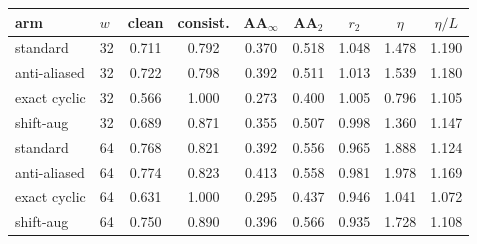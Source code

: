 \begin{tabular}{ll cccc ccc}
\toprule
arm & $w$ & clean & consist. & AA$_{\infty}$ & AA$_{2}$ & $r_2$ & $\eta$ & $\eta/L$ \\
\midrule
standard & 32 & 0.711 & 0.792 & 0.370 & 0.518 & 1.048 & 1.478 & 1.190 \\
anti-aliased & 32 & 0.722 & 0.798 & 0.392 & 0.511 & 1.013 & 1.539 & 1.180 \\
exact cyclic & 32 & 0.566 & 1.000 & 0.273 & 0.400 & 1.005 & 0.796 & 1.105 \\
shift-aug & 32 & 0.689 & 0.871 & 0.355 & 0.507 & 0.998 & 1.360 & 1.147 \\
\midrule
standard & 64 & 0.768 & 0.821 & 0.392 & 0.556 & 0.965 & 1.888 & 1.124 \\
anti-aliased & 64 & 0.774 & 0.823 & 0.413 & 0.558 & 0.981 & 1.978 & 1.169 \\
exact cyclic & 64 & 0.631 & 1.000 & 0.295 & 0.437 & 0.946 & 1.041 & 1.072 \\
shift-aug & 64 & 0.750 & 0.890 & 0.396 & 0.566 & 0.935 & 1.728 & 1.108 \\
\bottomrule
\end{tabular}